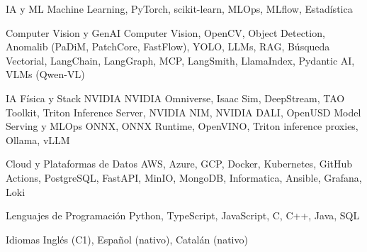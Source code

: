 

\begin{cvskills}

\cvskill
{IA y ML}
{Machine Learning, PyTorch, scikit-learn, MLOps, MLflow, Estadística}

\cvskill
{Computer Vision y GenAI}
{Computer Vision, OpenCV, Object Detection, Anomalib (PaDiM, PatchCore, FastFlow), YOLO, LLMs, RAG, Búsqueda Vectorial, LangChain, LangGraph, MCP, LangSmith, LlamaIndex, Pydantic AI, VLMs (Qwen-VL)}

\cvskill
{IA Física y Stack NVIDIA}
{NVIDIA Omniverse, Isaac Sim, DeepStream, TAO Toolkit, Triton Inference Server, NVIDIA NIM, NVIDIA DALI, OpenUSD}
\cvskill
{Model Serving y MLOps}
{ONNX, ONNX Runtime, OpenVINO, Triton inference proxies, Ollama, vLLM}


\cvskill
{Cloud y Plataformas de Datos}
{AWS, Azure, GCP, Docker, Kubernetes, GitHub Actions, PostgreSQL, FastAPI, MinIO, MongoDB, Informatica, Ansible, Grafana, Loki}

\cvskill
{Lenguajes de Programación}
{Python, TypeScript, JavaScript, C, C++, Java, SQL}

\cvskill
{Idiomas}
{Inglés (C1), Español (nativo), Catalán (nativo)}

\end{cvskills}